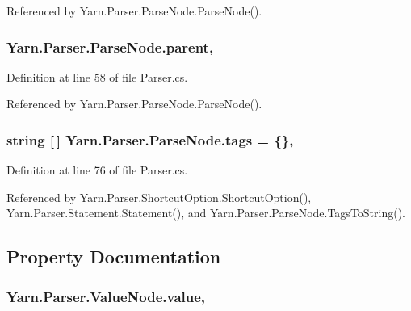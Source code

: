 Referenced by Yarn.\-Parser.\-Parse\-Node.\-Parse\-Node().

\hypertarget{a00142_af313a82103fcc2ff5a177dbb06b92f7b}{
\subsubsection[{parent}]{ Yarn.\-Parser.\-Parse\-Node.\-parent\hspace{0.3cm}{\ttfamily [package]}, {\ttfamily [inherited]}}}\label{a00142_af313a82103fcc2ff5a177dbb06b92f7b}


Definition at line 58 of file Parser.\-cs.



Referenced by Yarn.\-Parser.\-Parse\-Node.\-Parse\-Node().

\hypertarget{a00142_a58b3a15788fd2d4127d73619dc6d04ae}{
\subsubsection[{tags}]{\setlength{\rightskip}{0pt plus 5cm}string \mbox{[}$\,$\mbox{]} Yarn.\-Parser.\-Parse\-Node.\-tags = \{\}\hspace{0.3cm}{\ttfamily [package]}, {\ttfamily [inherited]}}}\label{a00142_a58b3a15788fd2d4127d73619dc6d04ae}


Definition at line 76 of file Parser.\-cs.



Referenced by Yarn.\-Parser.\-Shortcut\-Option.\-Shortcut\-Option(), Yarn.\-Parser.\-Statement.\-Statement(), and Yarn.\-Parser.\-Parse\-Node.\-Tags\-To\-String().



\subsection{Property Documentation}
\hypertarget{a00182_a51ab5939344f9bfa21181c02cf0e341d}{
\subsubsection[{value}]{ Yarn.\-Parser.\-Value\-Node.\-value\hspace{0.3cm}{\ttfamily [get]}, {\ttfamily [set]}}}\label{a00182_a51ab5939344f9bfa21181c02cf0e341d}


